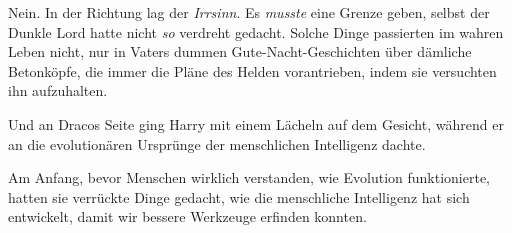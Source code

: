 Nein. In der Richtung lag der \emph{Irrsinn}. Es \emph{musste} eine Grenze geben, selbst der Dunkle Lord hatte nicht \emph{so} verdreht gedacht. Solche Dinge passierten im wahren Leben nicht, nur in Vaters dummen Gute-Nacht-Geschichten über dämliche Betonköpfe, die immer die Pläne des Helden vorantrieben, indem sie versuchten ihn aufzuhalten.

\later

Und an Dracos Seite ging Harry mit einem Lächeln auf dem Gesicht, während er an die evolutionären Ursprünge der menschlichen Intelligenz dachte.

Am Anfang, bevor Menschen wirklich verstanden, wie Evolution funktionierte, hatten sie verrückte Dinge gedacht, wie die menschliche Intelligenz hat sich entwickelt, damit wir bessere Werkzeuge erfinden konnten.

